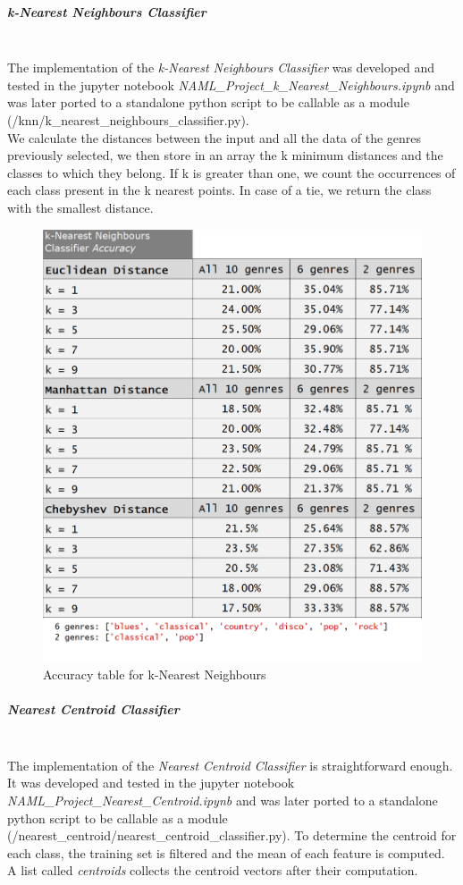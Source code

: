 \documentclass[12pt]{article}
\begin{document}
	\mbox{}\newpage
	\subparagraph{k-Nearest Neighbours Classifier}\mbox{}\\\newline
	The implementation of the \textit{k-Nearest Neighbours Classifier} was developed and tested in the jupyter notebook \textit{NAML\_Project\_k\_Nearest\_Neighbours.ipynb} and was later ported to a standalone python script to be callable as a module (/knn/k\_nearest\_neighbours\_classifier.py).\\
	We calculate the distances between the input and all the data of the genres previously selected, we then store in an array the k minimum distances and the classes to which they belong. If k is greater than one, we count the occurrences of each class present in the k nearest points. In case of a tie, we return the class with the smallest distance.
	\begin{figure}[H]
		\hspace{70pt}\includegraphics[scale=0.5]{knn_acc}
		\caption{Accuracy table for k-Nearest Neighbours}
	\end{figure}
	\newpage
	\subparagraph{Nearest Centroid Classifier}\mbox{}\\\newline
	The implementation of the \textit{Nearest Centroid Classifier} is straightforward enough. It was developed and tested in the jupyter notebook \textit{NAML\_Project\_Nearest\_Centroid.ipynb} and was later ported to a standalone python script to be callable as a module (/nearest\_centroid/nearest\_centroid\_classifier.py). 
	To determine the centroid for each class, the training set is filtered and the mean of each feature is computed. A list called \textit{centroids} collects the centroid vectors after their computation.
	
\end{document}
